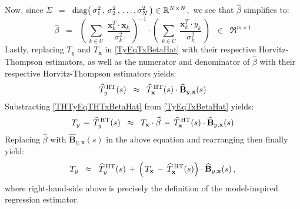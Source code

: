 \begin{remark}
\vskip 0.3cm
\noindent
Now, since $\Sigma$
\,$=$\, $\textnormal{diag}\!\left(\,\sigma_{1}^{2}\,,\,\sigma_{2}^{2}\,,\,\ldots,\sigma_{N}^{2}\,\right) \in \mathbb{R}^{N \times N}$,\,
we see that $\widehat{\beta}$ simplifies to:
\begin{equation*}
\widehat{\beta}
\;\; = \;\;
	\left(\,\underset{k \in U}{\sum}\;\dfrac{\mathbf{x}_{k}^{T} \cdot \mathbf{x}_{k}}{\sigma_{k}^{2}} \,\right)^{-1}
	\cdot
	\left(\,\underset{k \in U}{\sum}\;\dfrac{\mathbf{x}_{k}^{T} \cdot y_{k}}{\sigma_{k}^{2}} \,\right)
	\;\; \in \;\;
	\Re^{m \times 1}
\end{equation*}
Lastly, replacing $T_{y}$ and $T_{\mathbf{x}}$ in \eqref{TyEqTxBetaHat}
with their respective Horvitz-Thompson estimators,
as well as the numerator and denominator of $\widehat{\beta}$
with their respective Horvitz-Thompson estimators yields:
\begin{equation}\label{THTyEqTHTxBetaHat}
\widehat{T}_{y}^{\,\textnormal{HT}}(s)
\;\; \approx \;\; \widehat{T}_{\mathbf{x}}^{\,\textnormal{HT}}(s) \cdot \widehat{\mathbf{B}}_{y,\mathbf{x}}(s)
\end{equation}
Substracting \eqref{THTyEqTHTxBetaHat} from \eqref{TyEqTxBetaHat} yields:
\begin{equation*}
T_{y}
	\,-\,
	\widehat{T}_{y}^{\,\textnormal{HT}}(s)
\;\; \approx \;\;
	T_{\mathbf{x}} \cdot \widehat{\beta}
	\,-\,
	\widehat{T}_{\mathbf{x}}^{\,\textnormal{HT}}(s) \cdot \widehat{\mathbf{B}}_{y,\mathbf{x}}(s)
\end{equation*}
Replacing $\widehat{\beta}$ with $\widehat{\mathbf{B}}_{y,\mathbf{x}}(s)$ in the above equation
and rearranging then finally yield:
\begin{equation*}
T_{y}
\;\; \approx \;\;
	\widehat{T}_{y}^{\,\textnormal{HT}}(s)
	\,+\,
	\left(\,T_{\mathbf{x}} \,-\, \widehat{T}_{\mathbf{x}}^{\,\textnormal{HT}}(s) \right)
	\cdot \widehat{\mathbf{B}}_{y,\mathbf{x}}(s)\,,
\end{equation*}
where right-hand-side above is precisely the definition of the model-inspired regression estimator.
\end{remark}


